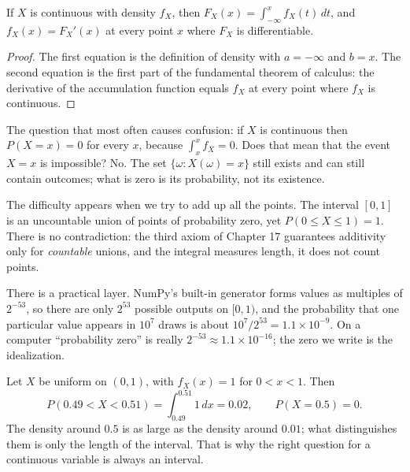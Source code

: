 \begin{teorema}
If $X$ is continuous with density $f_X$, then $F_X(x)=\int_{-\infty}^{x}f_X(t)\,dt$,
and $f_X(x)=F_X'(x)$ at every point $x$ where $F_X$ is differentiable.
\end{teorema}

\begin{proof}
The first equation is the definition of density with $a=-\infty$ and $b=x$. The second
equation is the first part of the fundamental theorem of calculus: the derivative of the accumulation
function equals $f_X$ at every point where $f_X$ is continuous.
\end{proof}

The question that most often causes confusion: if $X$ is continuous then
$P(X=x)=0$ for every $x$, because $\int_x^x f_X=0$. Does that mean that the event $X=x$
is impossible? No. The set $\{\omega:X(\omega)=x\}$ still exists and can still contain
outcomes; what is zero is its probability, not its existence.

The difficulty appears when we try to add up all the points. The interval $[0,1]$ is an uncountable
union of points of probability zero, yet $P(0\le X\le1)=1$. There is no
contradiction: the third axiom of Chapter 17 guarantees additivity only for
\emph{countable} unions, and the integral measures length, it does not count points.

There is a practical layer. NumPy's built-in generator forms values
as multiples of $2^{-53}$, so there are only $2^{53}$ possible outputs on $[0,1)$, and
the probability that one particular value appears in $10^7$ draws is about
$10^7/2^{53}=1.1\times10^{-9}$. On a computer ``probability zero'' is really
$2^{-53}\approx1.1\times10^{-16}$; the zero we write is the idealization.

\begin{contoh}
Let $X$ be uniform on $(0,1)$, with $f_X(x)=1$ for $0<x<1$. Then
\[
P(0.49<X<0.51)=\int_{0.49}^{0.51}1\,dx=0.02,
\qquad P(X=0.5)=0 .
\]
The density around $0.5$ is as large as the density around $0.01$; what distinguishes them
is only the length of the interval. That is why the right question for a continuous variable
is always an interval.
\end{contoh}

